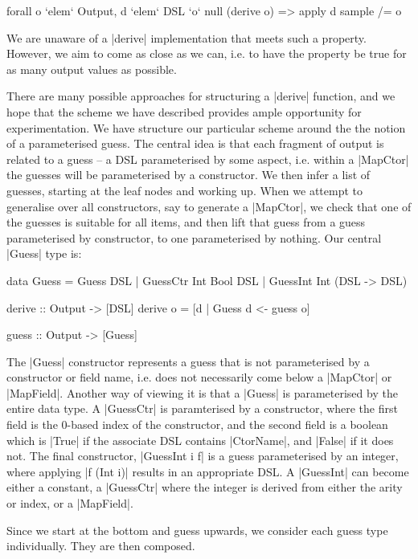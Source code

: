 \documentclass[preprint,draft]{sigplanconf}
\begin{document}
\ignore\begin{code}
forall o `elem` Output, d `elem` DSL `o` null (derive o) => apply d sample /= o
\end{code}

We are unaware of a |derive| implementation that meets such a property. However, we aim to come as close as we can, i.e. to have the property be true for as many output values as possible.

There are many possible approaches for structuring a |derive| function, and we hope that the scheme we have described provides ample opportunity for experimentation. We have structure our particular scheme around the the notion of a parameterised guess. The central idea is that each fragment of output is related to a guess -- a DSL parameterised by some aspect, i.e. within a |MapCtor| the guesses will be parameterised by a constructor. We then infer a list of guesses, starting at the leaf nodes and working up. When we attempt to generalise over all constructors, say to generate a |MapCtor|, we check that one of the guesses is suitable for all items, and then lift that guess from a guess parameterised by constructor, to one parameterised by nothing. Our central |Guess| type is:

\begin{code}
data Guess  =  Guess DSL
            |  GuessCtr Int Bool DSL
            |  GuessInt Int (DSL -> DSL)

derive :: Output -> [DSL]
derive o = [d | Guess d <- guess o]

guess :: Output -> [Guess]
\end{code}

The |Guess| constructor represents a guess that is not parameterised by a constructor or field name, i.e. does not necessarily come below a |MapCtor| or |MapField|. Another way of viewing it is that a |Guess| is parameterised by the entire data type. A |GuessCtr| is paramterised by a constructor, where the first field is the 0-based index of the constructor, and the second field is a boolean which is |True| if the associate DSL contains |CtorName|, and |False| if it does not. The final constructor, |GuessInt i f| is a guess parameterised by an integer, where applying |f (Int i)| results in an appropriate DSL. A |GuessInt| can become either a constant, a |GuessCtr| where the integer is derived from either the arity or index, or a |MapField|.

Since we start at the bottom and guess upwards, we consider each guess type individually. They are then composed.
\end{document}
